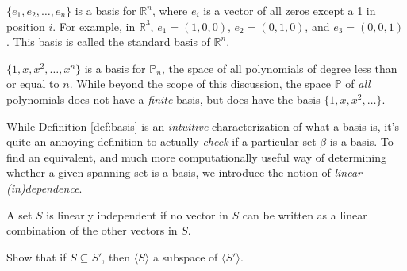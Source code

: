 \begin{example}
	$\{e_1, e_2, \ldots, e_n\}$ is a basis for $\mathbb{R}^n$, where $e_i$ is a vector of all zeros except a 1 in position $i$. For example, in $\mathbb{R}^3$, $e_1 = (1,0,0)$, $e_2 = (0,1,0)$, and $e_3 = (0,0,1)$. This basis is called the standard basis of $\mathbb{R}^n$.
\end{example}

\begin{example}
	$\{1,x,x^2,\ldots,x^n\}$ is a basis for $\mathbb{P}_n$, the space of all polynomials of degree less than or equal to $n$. While beyond the scope of this discussion, the space $\mathbb{P}$ of \textit{all} polynomials does not have a \textit{finite} basis, but does have the basis $\{1,x,x^2,\ldots\}$.
\end{example}

While Definition \ref{def:basis} is an \textit{intuitive} characterization of what a basis is, it's quite an annoying definition to actually \textit{check} if a particular set $\beta$ is a basis. To find an equivalent, and much more computationally useful way of determining whether a given spanning set is a basis, we introduce the notion of \textit{linear (in)dependence}.

\begin{definition}
	A set $S$ is linearly independent if no vector in $S$ can be written as a linear combination of the other vectors in $S$.
\end{definition}

\begin{problem}
	Show that if $S \subseteq S'$, then $\langle S \rangle$ a subspace of $\langle S' \rangle$.
\end{problem}